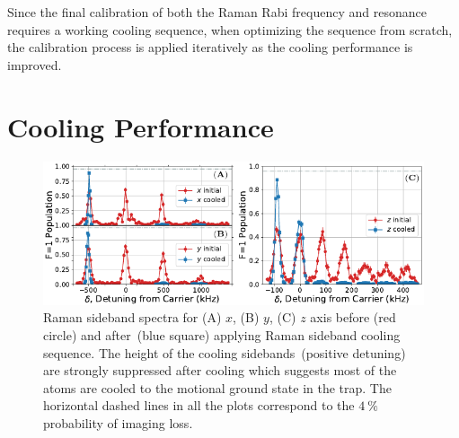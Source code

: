 Since the final calibration of both the Raman Rabi frequency and resonance requires a working
cooling sequence, when optimizing the sequence from scratch,
the calibration process is applied iteratively as the cooling performance is improved.

\section{Cooling Performance}
\label{ch:rsc:performance}

\begin{figure}
  \centering
  \includegraphics[width=\textwidth]{figures/na_rsc_spectrum.pdf}
  \caption[Raman sideband spectra before and after cooling]{
    Raman sideband spectra for (A) $x$, (B) $y$, (C) $z$ axis before (red circle)
    and after~(blue square) applying Raman sideband cooling sequence.
    The height of the cooling sidebands~(positive detuning)
    are strongly suppressed after cooling which suggests most of the atoms are cooled
    to the motional ground state in the trap.
    The horizontal dashed lines in all the plots correspond to the $4~\mathrm{\%}$ probability
    of imaging loss.
    \label{fig:rsc:na-spectrum}}
\end{figure}

